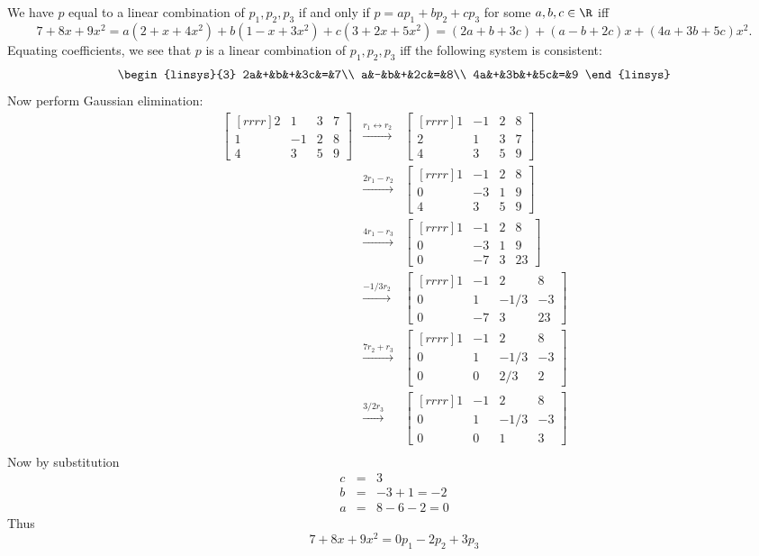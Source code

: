\begin{solution}
\noindent
We have $p$ equal to a linear combination of $p_1, p_2, p_3$ if and only if $p=ap_1+bp_2+cp_3$ for some $a,b,c\in\R$ iff 
\[
7 +8x + 9x^2=a(2+x+4x^2)+b(1-x+3x^2)+c(3+2x+5x^2)=(2a+b+3c)+(a-b+2c)x+(4a+3b+5c)x^2.
\]
Equating coefficients, we see that $p$ is a linear combination of $p_1,p_2,p_3$ iff the following system is consistent:
\[
\begin{linsys}{3}
2a&+&b&+&3c&=&7\\
a&-&b&+&2c&=&8\\
4a&+&3b&+&5c&=&9
\end{linsys}
\]
Now perform Gaussian elimination:
\begin{eqnarray*}
\begin{bmatrix}[rrrr]
2&1&3&7\\
1&-1&2&8\\
4&3&5&9
\end{bmatrix}
&\xrightarrow[]{r_1 \leftrightarrow r_2}&
\begin{bmatrix}[rrrr]
1&-1&2&8\\
2&1&3&7\\
4&3&5&9
\end{bmatrix}\\
&\xrightarrow[]{2r_1 - r_2}&
\begin{bmatrix}[rrrr]
1&-1&2&8\\
0&-3&1&9\\
4&3&5&9
\end{bmatrix}\\
&\xrightarrow[]{4r_1 - r_3}&
\begin{bmatrix}[rrrr]
1&-1&2&8\\
0&-3&1&9\\
0&-7&3&23
\end{bmatrix}\\
&\xrightarrow[]{-1/3r_2}&
\begin{bmatrix}[rrrr]
1&-1&2&8\\
0&1&-1/3&-3\\
0&-7&3&23
\end{bmatrix}\\
&\xrightarrow[]{7r_2 + r_3}&
\begin{bmatrix}[rrrr]
1&-1&2&8\\
0&1&-1/3&-3\\
0&0&2/3&2
\end{bmatrix}\\
&\xrightarrow[]{3/2r_3}&
\begin{bmatrix}[rrrr]
1&-1&2&8\\
0&1&-1/3&-3\\
0&0&1&3
\end{bmatrix}\\
\end{eqnarray*}
Now by substitution
\begin{eqnarray*}
c &=& 3\\
b &=& -3 + 1 = -2\\
a &=& 8-6-2 = 0
\end{eqnarray*}
Thus
$$
7 +8x + 9x^2 = 0p_1 -2p_2 + 3p_3
$$
\end{solution}
